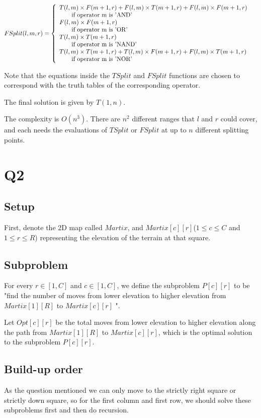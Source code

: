 \documentclass[a4paper]{article}
\begin{document}
	$$FSplit(l,m,r)=\left\{
	\begin{array}{lr}
		T(l,m)\times F(m+1,r) + F(l,m)\times T(m+1,r) + F(l,m)\times F(m+1,r)&\\
		\mbox{\quad\quad if operator m is 'AND'}&\\
		F(l,m)\times F(m+1,r)\\
		\mbox{\quad\quad if operator m is 'OR'}\\
		T(l,m)\times T(m+1,r)\\
		\mbox{\quad\quad if operator m is 'NAND'}\\
		T(l,m)\times T(m+1,r)+ T(l,m)\times F(m+1,r)+ F(l,m)\times T(m+1,r)\\
		\mbox{\quad\quad if operator m is 'NOR'}
	\end{array}
	\right.
	$$
	
	Note that the equations inside the $TSplit$ and $FSplit$ functions are chosen to correspond with the truth tables of the corresponding operator.
	
	The final solution is given by $T(1, n)$.
	
	The complexity is $O(n^3)$. There are $n^2$ different ranges that $l$ and $r$ could cover, and each needs the evaluations of $TSplit$ or $FSplit$ at up to $n$ different splitting points.


	\section*{Q2}
	\subsection*{Setup}
	First, denote the 2D map called $Martix$, and $Martix[c][r]$($1 \leq c \leq C$ and $1 \leq r \leq R$) representing the elevation of the terrain at that square.
	
	\subsection*{Subproblem}
	For every $r \in [1, C]$ and $c \in [1, C]$, we define the subproblem $P[c][r]$ to be "find the number of moves from lower elevation to higher elevation from $Martix[1][R]$ to $Martix[c][r]$ ". 
	
	Let $Opt[c][r]$ be the total moves from lower elevation to higher elevation along the path from $Martix[1][R]$ to $Martix[c][r]$, which is the optimal solution to the subproblem $P[c][r]$.
	
	\subsection*{Build-up order}
	As the question mentioned we can only move to the strictly right square or strictly down square, so for the first column and first row, we should solve these subproblems first and then do recursion.
	
\end{document}
